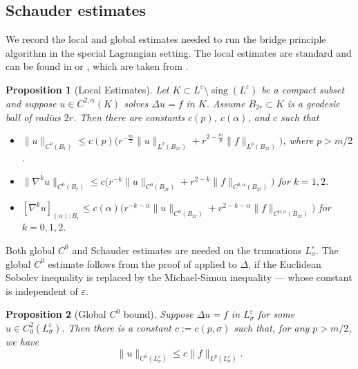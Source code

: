 \documentclass[11pt]{amsart}
\newtheorem{proposition}{Proposition}
\theoremstyle{definition}
\theoremstyle{remark}
\DeclareMathOperator{\sing}{sing}
\begin{document}
\subsection{Schauder estimates}\label{section: schauder}
We record the local and global estimates needed to run the bridge principle algorithm in the special Lagrangian setting. The local estimates are standard and can be found in \cite[Proposition 3.1]{Sm89} or \cite[Proposition 4.1]{Sm93}, which are taken from \cite{GT01}.
\begin{proposition}[Local Estimates]\label{prop: localest}
    Let $K \subset L^\varepsilon \setminus \sing(L^\varepsilon)$ be a compact subset and suppose $u \in C^{2,\alpha}(K)$ solves $\Delta u = f$ in $K$. Assume $B_{2r} \subset K$ is a geodesic ball of radius $2r$. Then there are constants $c(p)$, $c(\alpha)$, and $c$ such that
    \begin{itemize}
        \item[(a)] $\| u\|_{C^0( B_r)} \leq c(p)\big( r^{-\frac{m}{2}}\| u \|_{L^2(B_{2r})} + r^{2-\frac{m}{p}}\|f \|_{L^p(B_{2r})} \big)$, where $p > m/2$.
        \item[(b)] $\| \nabla^k u \|_{C^0( B_{r})} \leq c\big(r^{-k}\|u\|_{C^0( B_{2r})} +  r^{2-k}\|f\|_{C^{0,\alpha}(B_{2r})}\big)$ for $k = 1,2$.
        \item[(c)] $[\nabla^k u]_{(\alpha); B_{r}} \leq c(\alpha)\big(r^{-k-\alpha}\| u \|_{C^0(B_{2r})} + r^{2 - k -\alpha}\|f \|_{C^{0,\alpha}(B_{2r})}\big)$ for $k = 0,1,2$.
    \end{itemize}
\end{proposition}
Both global $C^0$ and Schauder estimates are needed on the truncations $L_\sigma^\varepsilon$. The global $C^0$ estimate follows from the proof of \cite[Theorem 8.16]{GT01} applied to $\Delta$, if the Euclidean Sobolev inequality is replaced by the Michael-Simon inequality \cite{MS73} --- whose constant is independent of $\varepsilon$.
\begin{proposition}[Global $C^0$ bound] \label{c0}
    Suppose $\Delta u = f$ in $L_\sigma^\varepsilon$ for some $u \in C_0^{2}(L_\sigma^\varepsilon)$. Then there is a constant $c:= c(p,\sigma)$ such that, for any $p > m/2$, we have
    \[\|u\|_{C^0(L_\sigma^\varepsilon)} \leq c\|f\|_{L^p(L_\sigma^\varepsilon)}.\]
\end{proposition}
\end{document}
